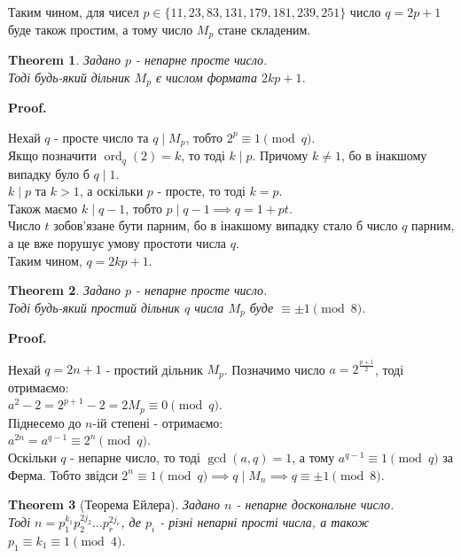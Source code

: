 \documentclass[a4paper, 14pt]{extarticle}
\makeatletter
\theoremstyle{theoremdd}
\newtheorem{theorem}{Theorem}[subsection]
\theoremstyle{theoremdd}
\theoremstyle{theoremdd}
\theoremstyle{theoremdd}
\theoremstyle{theoremdd}
\theoremstyle{theoremdd}
\theoremstyle{theoremdd}
\theoremstyle{theoremdd}
\def\qed{$\blacksquare$}
\renewenvironment{proof}[1][Proof.\\]{\par
\pushQED{\hfill \qed}%
\normalfont \topsep6\p@\@plus6\p@\relax
\trivlist
\item\relax
{\bfseries
#1\@addpunct{.}}\hspace\labelsep\ignorespaces
}{%
\popQED\endtrivlist\@endpefalse
}
\DeclareMathOperator{\ord}{ord}
\makeatother
\begin{document}
Таким чином, для чисел $p \in \{11,23,83,131,179,181,239,251\}$ число $q = 2p+1$ буде також простим, а тому число $M_p$ стане складеним.

\begin{theorem}
Задано $p$ - непарне просте число.\\
Тоді будь-який дільник $M_p$ є числом формата $2kp+1$.
\end{theorem}

\begin{proof}
Нехай $q$ - просте число та $q \mid M_p$, тобто $2^p \equiv 1 \pmod q$.\\
Якщо позначити $\ord_q (2) = k$, то тоді $k \mid p$. Причому $k \neq 1$, бо в інакшому випадку було б $q \mid 1$.\\
$k \mid p$ та $k > 1$, а оскільки $p$ - просте, то тоді $k = p$.\\
Також маємо $k \mid q-1$, тобто $p \mid q-1 \implies q = 1 + pt$.\\
Число $t$ зобов'язане бути парним, бо в інакшому випадку стало б число $q$ парним, а це вже порушує умову простоти числа $q$.\\
Таким чином, $q = 2kp+1$.
\end{proof}

\begin{theorem}
Задано $p$ - непарне просте число.\\
Тоді будь-який простий дільник $q$ числа $M_p$ буде $\equiv \pm 1 \pmod 8$.
\end{theorem}

\begin{proof}
Нехай $q = 2n+1$ - простий дільник $M_p$. Позначимо число $a = 2^{\frac{p+1}{2}}$, тоді отримаємо:\\
$a^2 - 2 = 2^{p+1}-2 = 2M_p \equiv 0 \pmod q$.\\
Піднесемо до $n$-ій степені - отримаємо:\\
$a^{2n} = a^{q-1} \equiv 2^n \pmod q$.\\
Оскільки $q$ - непарне число, то тоді $\gcd(a,q) = 1$, а тому $a^{q-1} \equiv 1 \pmod q$ за Ферма. Тобто звідси $2^n \equiv 1 \pmod q \implies q \mid M_n \implies q \equiv \pm 1 \pmod 8$.
\end{proof}

\begin{theorem}[Теорема Ейлера]
Задано $n$ - непарне доскональне число.\\
Тоді $n = p_1^{k_1} p_2^{2j_2} \dots p_r^{2j_r}$, де $p_i$ - різні непарні прості числа, а також $p_1 \equiv k_1 \equiv 1 \pmod 4$.
\end{theorem}
\end{document}
